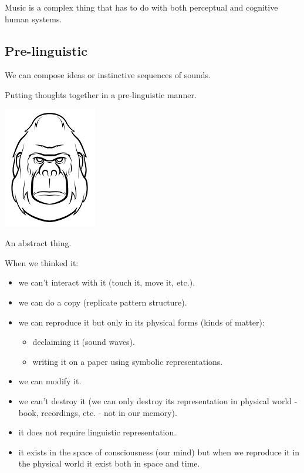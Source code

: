 Music is a complex thing that has to do with both perceptual and cognitive human systems.

\subsection{Pre-linguistic}\label{pre-linguistic}

We can compose ideas or instinctive sequences of sounds.

Putting thoughts together in a pre-linguistic manner.

\begin{center}
\includegraphics[scale=0.35]{../img/pensiero.png}
\end{center}

An abstract thing.

When we thinked it:

\begin{itemize}
\tightlist
\item we can't interact with it (touch it, move it, etc.).
\item we can do a copy (replicate pattern structure).
\item we can reproduce it but only in its physical forms (kinds of matter):
   \begin{itemize}
   \tightlist
   \item declaiming it (sound waves).
   \item writing it on a paper using symbolic representations.
   \end{itemize}
\item we can modify it.
\item we can't destroy it (we can only destroy its representation in physical world - book, recordings, etc. - not in our memory).
\item it does not require linguistic representation.
\item it exists in the space of consciousness (our mind) but when we
  reproduce it in the physical world it exist both in space and time.
\end{itemize}

